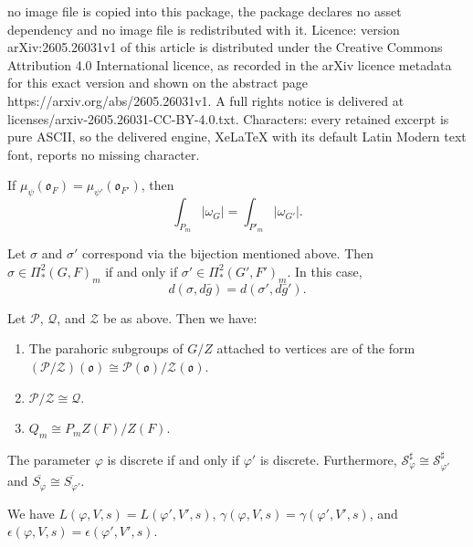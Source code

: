 \documentclass[10pt,a4paper]{amsart}
\newcommand{\SchP}{\mathcal{P}}
\newcommand{\SchQ}{\mathcal{Q}}
\begin{document}
no image file is copied into this package, the package declares no asset dependency and no image file is redistributed with it. Licence: version arXiv:2605.26031v1 of this article is distributed under the Creative Commons Attribution 4.0 International licence, as recorded in the arXiv licence metadata for this exact version and shown on the abstract page https://arxiv.org/abs/2605.26031v1. A full rights notice is delivered at licenses/arxiv-2605.26031-CC-BY-4.0.txt. Characters: every retained excerpt is pure ASCII, so the delivered engine, XeLaTeX with its default Latin Modern text font, reports no missing character.
\begin{corollary} \label{Measures_are_equal_close_field_type1}
    If $\mu_{\psi}(\mathfrak{o}_F) = \mu_{\psi'}(\mathfrak{o}_{F'})$, then
    \[ \int_{P_m} \lvert \omega_G \rvert = \int_{P'_m} \lvert \omega_{G'} \rvert. \]
\end{corollary}

\begin{theorem}\label{formal_degrees_are_equal1}
    Let $\sigma$ and $\sigma'$ correspond via the bijection mentioned above. Then $\sigma \in \Pi_*^2(G,F)_m$ if and only if $\sigma' \in \Pi_*^2(G', F')_m$. In this case,
    \[
    d(\sigma, d\bar{g}) = d(\sigma', d\bar{g}').
    \]
\end{theorem}

\begin{theorem}\label{Thm:Parahoric_subgroups_of_quotients}
    Let $\SchP$, $\SchQ$, and $\mathcal{Z}$ be as above. Then we have:
    \begin{enumerate}
        \item The parahoric subgroups of $G/Z$ attached to vertices are of the form $(\SchP/\mathcal{Z})(\mathfrak{o}) \cong \SchP(\mathfrak{o})/\mathcal{Z}(\mathfrak{o})$.
        \item $\SchP/\mathcal{Z} \cong \SchQ$.
        \item $Q_m \cong P_m Z(F)/Z(F)$.
    \end{enumerate}
\end{theorem}

\begin{proposition}\label{param_over_close_fields}
    The parameter $\varphi$ is discrete if and only if $\varphi'$ is discrete. Furthermore, $\mathcal{S}_{\varphi}^{\sharp} \cong \mathcal{S}_{\varphi'}^{\sharp}$ and $\overline{S_{\varphi}} \cong \overline{S_{\varphi'}}$.
\end{proposition}

\begin{proposition}\label{L_functions_of_reps_are_equal}
    We have $L(\varphi,V,s) = L(\varphi',V',s)$, $\gamma(\varphi,V,s) = \gamma(\varphi',V',s)$, and $\epsilon(\varphi,V,s) = \epsilon(\varphi',V',s)$.
\end{proposition}
\end{document}
